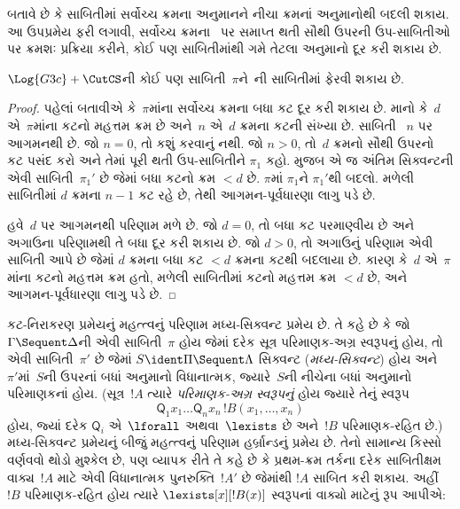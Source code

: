  બતાવે છે કે
સાબિતીમાં સર્વોચ્ચ ક્રમના \CutCS{}
અનુમાનને નીચા ક્રમનાં \CutCS{} અનુમાનોથી
બદલી શકાય.
આ ઉપપ્રમેય ફરી લગાવી,
સર્વોચ્ચ ક્રમના~\CutCS{} પર સમાપ્ત
થતી સૌથી ઉપરની ઉપ-સાબિતીઓ પર
ક્રમશઃ પ્રક્રિયા કરીને, કોઈ પણ
સાબિતીમાંથી ગમે તેટલા \CutCS{}
અનુમાનો દૂર કરી શકાય છે.

\begin{thm}
$\Log{G3c} + \CutCS$ની કોઈ પણ
સાબિતી~$\pi$ને~ની
સાબિતીમાં ફેરવી શકાય છે.
\end{thm}

\begin{proof}
  પહેલાં બતાવીએ કે~$\pi$માંના સર્વોચ્ચ
  ક્રમના બધા કટ દૂર કરી શકાય છે.
  માનો કે~$d$ એ~$\pi$માંના કટનો
  મહત્તમ ક્રમ છે અને~$n$ એ~$d$
  ક્રમના કટની સંખ્યા છે. સાબિતી
  ~$n$ પર આગમનથી છે.
  જો $n=0$, તો કશું કરવાનું નથી.
  જો $n>0$, તો~$d$ ક્રમનો
  સૌથી ઉપરનો કટ પસંદ કરો અને
  તેમાં પૂરી થતી ઉપ-સાબિતીને
  $\pi_1$ કહો.
   મુજબ
  એ જ અંતિમ સિક્વન્ટની એવી
  સાબિતી~$\pi_1'$ છે જેમાં
  બધા કટનો ક્રમ $<d$ છે.
  $\pi$માં $\pi_1$ને $\pi_1'$થી
  બદલો. મળેલી સાબિતીમાં
  $d$ ક્રમના $n-1$ કટ રહે છે,
  તેથી આગમન-પૂર્વધારણા લાગુ પડે છે.

  હવે~$d$ પર આગમનથી પરિણામ મળે છે.
  જો $d=0$, તો બધા કટ પરમાણ્વીય છે
  અને અગાઉના પરિણામથી તે બધા
  દૂર કરી શકાય છે. જો $d>0$,
  તો અગાઉનું પરિણામ એવી સાબિતી આપે
  છે જેમાં $d$ ક્રમના બધા કટ
  $<d$ ક્રમના કટથી બદલાયા છે.
  કારણ કે~$d$ એ~$\pi$માંના કટનો
  મહત્તમ ક્રમ હતો, મળેલી સાબિતીમાં
  કટનો મહત્તમ ક્રમ $<d$ છે,
  અને આગમન-પૂર્વધારણા લાગુ પડે છે.
\end{proof}
\endgroup

\begingroup
\makeatletter{}\makeatother


\label{guunit:OLP-0661}


કટ-નિરાકરણ પ્રમેયનું મહત્ત્વનું
પરિણામ મધ્ય-સિક્વન્ટ પ્રમેય છે.
તે કહે છે કે જો
$\Gamma \Sequent \Delta$ની
એવી સાબિતી~$\pi$ હોય
જેમાં દરેક સૂત્ર પરિમાણક-અગ્ર
સ્વરૂપનું હોય, તો એવી
સાબિતી~$\pi'$ છે જેમાં
$S \ident \Pi \Sequent \Lambda$
સિક્વન્ટ (\emph{મધ્ય-સિક્વન્ટ})
હોય અને~$\pi'$માં~$S$ની
ઉપરનાં બધાં અનુમાનો વિધાનાત્મક,
જ્યારે~$S$ની નીચેના બધાં અનુમાનો
પરિમાણકનાં હોય.
(સૂત્ર~$!A$ ત્યારે
\emph{પરિમાણક-અગ્ર સ્વરૂપનું}
હોય જ્યારે તેનું સ્વરૂપ
\[\mathsf{Q}_1x_1\dots\mathsf{Q}_nx_n\,!B(x_1,\dots,x_n)\]
હોય, જ્યાં દરેક
$\mathsf{Q}_i$ એ~$\lforall$
અથવા~$\lexists$ છે અને~$!B$ પરિમાણક-રહિત છે.)
મધ્ય-સિક્વન્ટ પ્રમેયનું બીજું
મહત્ત્વનું પરિણામ હર્બ્રાન્ડનું
પ્રમેય છે. તેનો સામાન્ય કિસ્સો
વર્ણવવો થોડો મુશ્કેલ છે,
પણ વ્યાપક રીતે તે કહે છે કે
પ્રથમ-ક્રમ તર્કના દરેક
સાબિતીક્ષમ વાક્ય~$!A$
માટે એવી વિધાનાત્મક
પુનરુક્તિ~$!A'$ છે જેમાંથી
$!A$ સાબિત કરી શકાય.
અહીં~$!B$ પરિમાણક-રહિત હોય ત્યારે
$\lexists[x][!B(x)]$ સ્વરૂપનાં
વાક્યો માટેનું રૂપ આપીએ:

